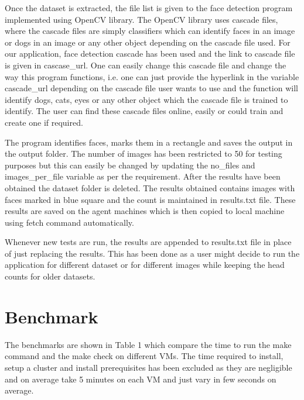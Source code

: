 \documentclass[9pt,twocolumn,twoside]{../../styles/osajnl}
\begin{document}
Once the dataset is extracted, the file list is given to the face
detection program implemented using OpenCV library. The OpenCV library
uses cascade files, where the cascade files are simply classifiers
which can identify faces in an image or dogs in an image or any other
object depending on the cascade file used. For our application, face
detection cascade has been used and the link to cascade file is given
in cascase\_url.  One can easily change this cascade file and change
the way this program functions, i.e. one can just provide the
hyperlink in the variable cascade\_url depending on the cascade file
user wants to use and the function will identify dogs, cats, eyes or
any other object which the cascade file is trained to identify. The user
can find these cascade files online, easily or could train and create
one if required.

The program identifies faces, marks them in a rectangle and saves the
output in the output folder. The number of images has been restricted
to 50 for testing purposes but this can easily be changed by updating
the no\_files and images\_per\_file variable as per the
requirement. After the results have been obtained the dataset folder
is deleted. The results obtained contains images with faces marked in
blue square and the count is maintained in results.txt file. These
results are saved on the agent machines which is then copied to
local machine using fetch command automatically.

Whenever new tests are run, the results are appended to results.txt
file in place of just replacing the results. This has been done as a
user might decide to run the application for different dataset or for
different images while keeping the head counts for older datasets.

\section{Benchmark}
The benchmarks are shown in Table 1 which compare the
time to run the make command and the make check on different VMs. The time
required to install, setup a cluster and install prerequisites has been
excluded as they are negligible and on average take 5 minutes on each
VM and just vary in few seconds on average.
\end{document}
